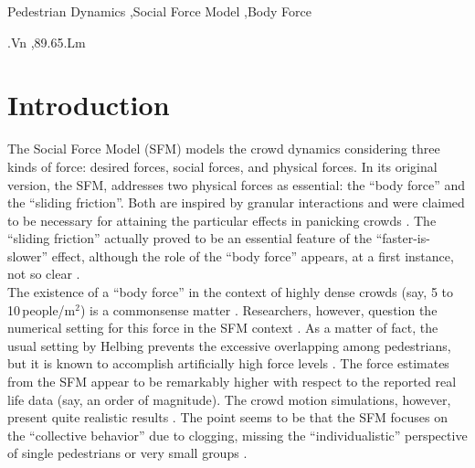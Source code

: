 \documentclass[preprint,12pt]{elsarticle}
\begin{document}
\begin{frontmatter}
\begin{abstract}
\end{abstract}

\begin{keyword}

Pedestrian Dynamics \sep Social Force Model \sep Body Force


.Vn \sep 89.65.Lm

\end{keyword}

\end{frontmatter}


\section{\label{introduction}Introduction}

The Social Force Model (SFM) models the crowd dynamics 
considering three kinds of force: desired forces, social forces, and physical forces.
In its original version, the SFM, addresses two physical forces as essential: 
 the ``body force'' and the ``sliding friction''. Both are 
inspired by granular interactions and were claimed to be necessary  
for attaining the particular effects in panicking crowds \cite{helbing_2000}. 
The ``sliding friction'' actually proved to be an essential feature of the 
``faster-is-slower'' effect, although the role of the ``body force'' appears, 
at a first instance, not so clear \cite{dorso_2005,dorso_2007,dorso_2011}. \\ 

The existence of a ``body force'' in the context of highly dense crowds (say, 5 
to 10$\,$people/m$^2$) is a commonsense matter \cite{henein_2007,fruin_1993}. 
Researchers, however, question the numerical setting for this force in 
the SFM context \cite{lakoba_2005}. As a matter of fact, the usual setting by 
Helbing prevents the excessive overlapping among pedestrians, but it is known to 
accomplish artificially high force levels 
\cite{helbing_2000,lakoba_2005,langston_2006,lin_2017}. The force estimates 
from the SFM appear to be remarkably higher with respect to the reported real 
life data (say, an order of magnitude). The crowd motion simulations, however, 
present quite realistic results \cite{lakoba_2005,langston_2006,dorso_2017}. 
The 
point seems to be that the SFM focuses on the ``collective behavior'' due 
to clogging, missing the ``individualistic'' perspective  of single pedestrians 
or very small groups \cite{helbing_2000,henein_2007,narain_2009}.  \\ 
\end{document}
